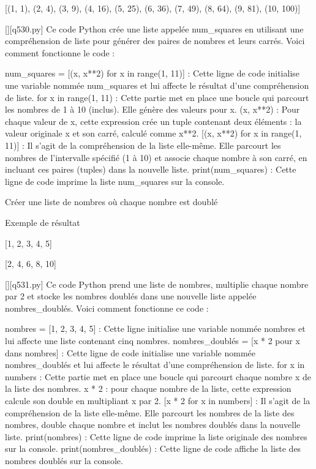 [(1, 1), (2, 4), (3, 9), (4, 16), (5, 25), (6, 36), (7, 49), (8, 64), (9, 81), (10, 100)]
        \par
        \begin{solution}
            \renewcommand{\nomfichier}{q530.py}
            \pythonfile{\chemincode \nomfichier}[][\nomfichier]
            Ce code Python crée une liste appelée num_squares en utilisant une compréhension de liste pour générer des paires de nombres et leurs carrés. Voici comment fonctionne le code :

    num_squares = [(x, x**2) for x in range(1, 11)] : Cette ligne de code initialise une variable nommée num_squares et lui affecte le résultat d'une compréhension de liste.
        for x in range(1, 11) : Cette partie met en place une boucle qui parcourt les nombres de 1 à 10 (inclus). Elle génère des valeurs pour x.
        (x, x**2) : Pour chaque valeur de x, cette expression crée un tuple contenant deux éléments : la valeur originale x et son carré, calculé comme x**2.
        [(x, x**2) for x in range(1, 11)] : Il s'agit de la compréhension de la liste elle-même. Elle parcourt les nombres de l'intervalle spécifié (1 à 10) et associe chaque nombre à son carré, en incluant ces paires (tuples) dans la nouvelle liste.
    print(num_squares) : Cette ligne de code imprime la liste num_squares sur la console.
        \end{solution}
        

        \question
        Créer une liste de nombres où chaque nombre est doublé

Exemple de résultat

[1, 2, 3, 4, 5]

[2, 4, 6, 8, 10]
        \par
        \begin{solution}
            \renewcommand{\nomfichier}{q531.py}
            \pythonfile{\chemincode \nomfichier}[][\nomfichier]
            Ce code Python prend une liste de nombres, multiplie chaque nombre par 2 et stocke les nombres doublés dans une nouvelle liste appelée nombres_doublés. Voici comment fonctionne ce code :

    nombres = [1, 2, 3, 4, 5] : Cette ligne initialise une variable nommée nombres et lui affecte une liste contenant cinq nombres.
    nombres_doublés = [x * 2 pour x dans nombres] : Cette ligne de code initialise une variable nommée nombres_doublés et lui affecte le résultat d'une compréhension de liste.
        for x in numbers : Cette partie met en place une boucle qui parcourt chaque nombre x de la liste des nombres.
        x * 2 : pour chaque nombre de la liste, cette expression calcule son double en multipliant x par 2.
        [x * 2 for x in numbers] : Il s'agit de la compréhension de la liste elle-même. Elle parcourt les nombres de la liste des nombres, double chaque nombre et inclut les nombres doublés dans la nouvelle liste.
    print(nombres) : Cette ligne de code imprime la liste originale des nombres sur la console.
    print(nombres_doublés) : Cette ligne de code affiche la liste des nombres doublés sur la console.
        \end{solution}
        

